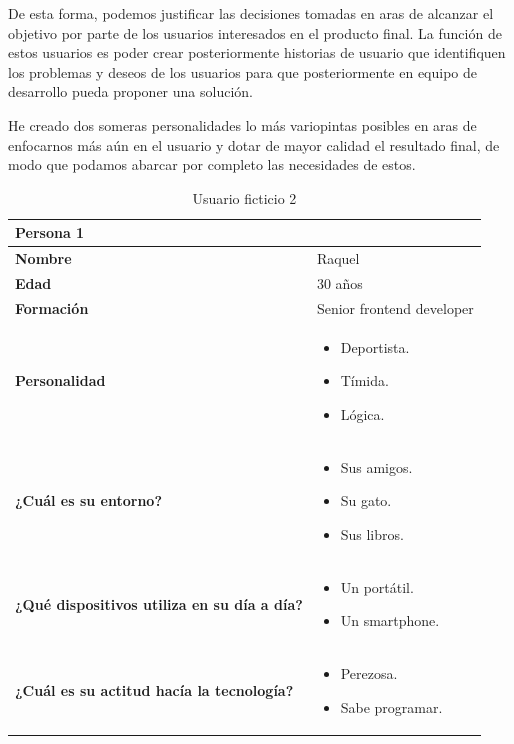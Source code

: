 De esta forma, podemos justificar las decisiones tomadas en aras de alcanzar el objetivo
por parte de los usuarios interesados en el producto final. La función de estos usuarios
es poder crear posteriormente historias de usuario que identifiquen los problemas y deseos
de los usuarios para que posteriormente en equipo de desarrollo pueda proponer una
solución.

He creado dos someras personalidades lo más variopintas posibles en aras de enfocarnos más
aún en el usuario y dotar de mayor calidad el resultado final, de modo que podamos abarcar
por completo las necesidades de estos.

\begin{table}[H]
   \begin{center}
      \begin{tabular}{| p{} | p{} |}
         \hline
         Persona 1 &  \\ \hline
         \textbf{Nombre} & Raquel \\
         \textbf{Edad} & 30 años \\
         \textbf{Formación} & Senior frontend developer \\
         \textbf{Personalidad} & \begin{itemize}
                \item Deportista.
                \item Tímida.
                \item Lógica. \end{itemize} \\
         \textbf{¿Cuál es su entorno?} & \begin{itemize}
                \item Sus amigos.
                \item Su gato.
                \item Sus libros. \end{itemize} \\
         \textbf{¿Qué dispositivos utiliza en su día a día?} & \begin{itemize}
                \item Un portátil.
                \item Un smartphone. \end{itemize} \\
            \textbf{¿Cuál es su actitud hacía la tecnología?} & \begin{itemize}
                \item Perezosa.
                \item Sabe programar. \end{itemize} \\
            \hline
      \end{tabular}
      \caption{Usuario ficticio 2}
   \end{center}
\end{table}

